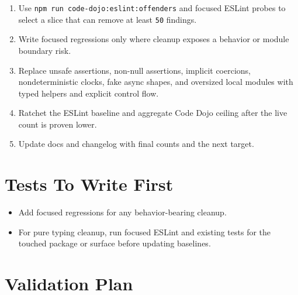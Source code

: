 \begin{enumerate}
\def\labelenumi{\arabic{enumi}.}
\tightlist
\item
  Use \texttt{n\allowbreak{}p\allowbreak{}m\allowbreak{} \allowbreak{}r\allowbreak{}u\allowbreak{}n\allowbreak{} \allowbreak{}c\allowbreak{}o\allowbreak{}d\allowbreak{}e\allowbreak{}-\allowbreak{}d\allowbreak{}o\allowbreak{}j\allowbreak{}o\allowbreak{}:\allowbreak{}e\allowbreak{}s\allowbreak{}l\allowbreak{}i\allowbreak{}n\allowbreak{}t\allowbreak{}:\allowbreak{}o\allowbreak{}f\allowbreak{}f\allowbreak{}e\allowbreak{}n\allowbreak{}d\allowbreak{}e\allowbreak{}r\allowbreak{}s} and focused ESLint probes to select a slice that can remove at least \texttt{5\allowbreak{}0} findings.
\item
  Write focused regressions only where cleanup exposes a behavior or module boundary risk.
\item
  Replace unsafe assertions, non-null assertions, implicit coercions, nondeterministic clocks, fake async shapes, and oversized local modules with typed helpers and explicit control flow.
\item
  Ratchet the ESLint baseline and aggregate Code Dojo ceiling after the live count is proven lower.
\item
  Update docs and changelog with final counts and the next target.
\end{enumerate}

\section{Tests To Write First}\label{record-239-tests-to-write-first}

\begin{itemize}
\tightlist
\item
  Add focused regressions for any behavior-bearing cleanup.
\item
  For pure typing cleanup, run focused ESLint and existing tests for the touched package or surface before updating baselines.
\end{itemize}

\section{Validation Plan}\label{record-239-validation-plan}

